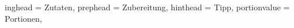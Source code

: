 \documentclass{article}
\begin{document}
\setHeadlines
{%
    inghead = Zutaten,
    prephead = Zubereitung,
    hinthead = Tipp,
    portionvalue = Portionen,
}


%

\newpage

\newpage
%
%
%
%

%
%
%

%
%
%

%

\newpage
%
\end{document}

